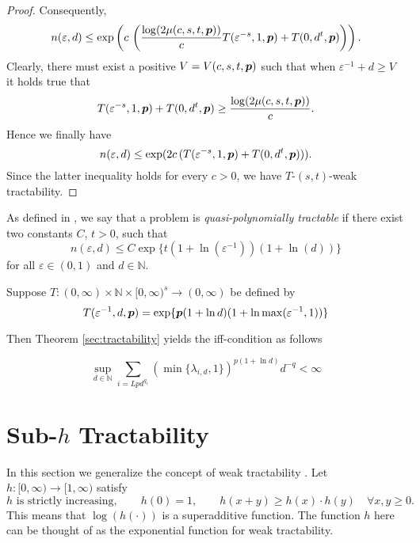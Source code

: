 \documentclass[11pt,a4paper]{article}
\newcommand{\kachi}[1]{\begingroup\color{ForestGreen}#1\endgroup}
\begin{document}
{\begin{proof}
Consequently,
\[
n(\varepsilon, d) \le \exp\left(c\, \left(
\frac{\log (2\mu (c,s,t,\boldsymbol{p}) )}{c}
T(\varepsilon^{-s},1,\boldsymbol{p}) + T(0,d^t,\boldsymbol{p})
\right)\right).
\]
Clearly, there must exist a positive $V=V(c,s,t,\boldsymbol{p})$ such that when $\varepsilon^{-1} +d \ge V$ it holds true that
\[
  T(\varepsilon^{-s},1,\boldsymbol{p}) + T(0,d^t,\boldsymbol{p}) \ge \frac{\log (2\mu (c,s,t,\boldsymbol{p}) )}{c}.
\]
Hence we finally have 
\[
n(\varepsilon,d) \le \exp (2c\, (T(\varepsilon^{-s},1,\boldsymbol{p}) + T(0,d^t,\boldsymbol{p}))).
\]
Since the latter inequality holds for every $c>0$, we have $T$-$(s,t)$-weak tractability.

\end{proof}
}

\kachi{
\begin{example} 
\begin{definition}
    As defined in \cite{GW11}, we say that a problem is \emph{quasi-polynomially tractable} if there exist two constants $C$, $t > 0$, such that
\[
n(\varepsilon,d) \leq C\exp\{t(1+\ln(\varepsilon^{-1}))(1+\ln(d))\}\] 
for all $\varepsilon \in (0,1)$ and $d\in\mathbb{N}$.\\
\end{definition}
Suppose $ T :(0,\infty) \times \mathbb{N} \times [0,\infty)^s \rightarrow (0,\infty)$
be defined by
\[
 T(\varepsilon^{-1},d,\boldsymbol{p})= \exp\{\boldsymbol{p}(1+\ln d)(1+\ln \max(\varepsilon^{-1},1))\}
\]
\end{example}

Then Theorem \ref{sec:tractability} yields the iff-condition as follows

\[
\sup_{d\in\mathbb{N}}\sum_{i=Lpd^{q_1}} \left(\min\{\lambda_{i,d},1\} \right)^{p(1+\ln d)}d^{-q} < \infty
\]
}

\section{Sub-$h$ Tractability}
In this section we generalize the concept of weak tractability \cite{}.  Let  $h:[0,\infty) \to [1,\infty)$ satisfy
\begin{equation} \label{eq:h_cond}
	h \text{ is strictly increasing}, \qquad 
	h(0)=1, \qquad  
 h(x+y) \ge  h(x)\cdot h(y)  \quad \forall x,y \ge 0.
\end{equation}
This means that $\log(h(\cdot))$ is a superadditive function.  The function $h$ here can be thought of as the exponential function for weak tractability.
\end{document}
